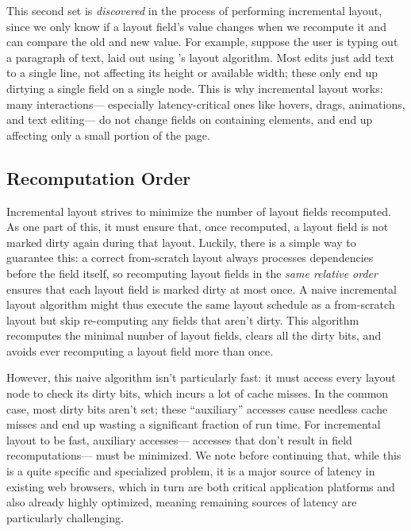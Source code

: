 This second set is \emph{discovered}
  in the process of performing incremental layout,
  since we only know if a layout field's value changes
  when we recompute it and can compare the old and new value.
For example, suppose the user is typing out a paragraph of text,
  laid out using 's layout algorithm.
Most edits just add text to a single line,
  not affecting its height or available width;
  these only end up dirtying a single field on a single node.
This is why incremental layout works:
  many interactions---%
  especially latency-critical ones like
  hovers, drags, animations, and text editing---%
  do not change fields on containing elements,
  and end up affecting only a small portion of the page.

\subsection{Recomputation Order}

Incremental layout strives to minimize
  the number of layout fields recomputed.
As one part of this, it must ensure that, once recomputed,
  a layout field is not marked dirty again during that layout.
Luckily, there is a simple way to guarantee this:
  a correct from-scratch layout
  always processes dependencies before the field itself,
  so recomputing layout fields
  in the \emph{same relative order}
  ensures that each layout field is marked dirty at most once.
A naive incremental layout algorithm might thus
  execute the same layout schedule as a from-scratch layout
  but skip re-computing any fields that aren't dirty.
This algorithm recomputes the minimal number of layout fields,
  clears all the dirty bits,
  and avoids ever recomputing a layout field more than once.

However, this naive algorithm isn't particularly fast:
  it must access every layout node to check its dirty bits,
  which incurs a lot of cache misses.
In the common case, most dirty bits aren't set;
  these ``auxiliary'' accesses cause needless cache misses
  and end up wasting a significant fraction of run time.
For incremental layout to be fast,
  auxiliary accesses---%
  accesses that don't result in field recomputations---%
  must be minimized.
We note before continuing that,
  while this is a quite specific and specialized problem,
  it is a major source of latency in existing web browsers,
  which in turn are both critical application platforms
  and also already highly optimized,
  meaning remaining sources of latency are
  particularly challenging.

